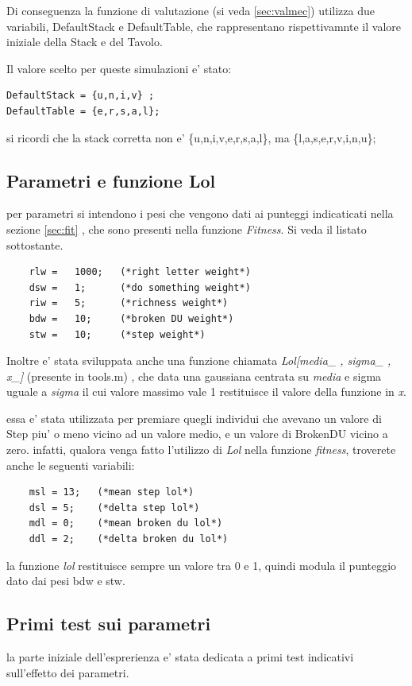 \documentclass[12pt, a4paper]{article}
\begin{document}
Di conseguenza la funzione di valutazione (si veda \ref{sec:valmec}) utilizza due variabili, DefaultStack e DefaultTable, che rappresentano rispettivamnte il valore iniziale della Stack e del Tavolo.

Il valore scelto per queste simulazioni e' stato: 

\begin{lstlisting}
DefaultStack = {u,n,i,v} ;
DefaultTable = {e,r,s,a,l};
\end{lstlisting}

si ricordi che la stack corretta non e' \{u,n,i,v,e,r,s,a,l\}, ma \{l,a,s,e,r,v,i,n,u\};

\subsection{Parametri e funzione Lol}
per parametri si intendono i pesi che vengono dati ai punteggi indicaticati nella sezione \ref{sec:fit} , che sono presenti nella funzione {\itshape Fitness}.
Si veda il listato sottostante.
\begin{lstlisting}
	rlw	=	1000;	(*right letter weight*)
	dsw	=	1;		(*do something weight*)
	riw	=	5;		(*richness weight*) 
	bdw	=	10;		(*broken DU weight*) 
	stw	=	10;		(*step weight*) 
\end{lstlisting}

Inoltre e' stata sviluppata anche una funzione chiamata {\itshape Lol[media\_ , sigma\_ , x\_]} (presente in tools.m) , che data una gaussiana centrata su {\itshape media} e sigma uguale a {\itshape sigma} il cui valore massimo vale 1 restituisce il valore della funzione in {\itshape x}.

essa e' stata utilizzata per premiare quegli individui che avevano un valore di Step piu' o meno vicino ad un valore medio, e un valore di BrokenDU vicino a zero.
infatti, qualora venga fatto l'utilizzo di {\itshape Lol} nella funzione {\itshape fitness}, troverete anche le seguenti variabili:
\begin{lstlisting}
	msl = 13;	(*mean step lol*) 
	dsl = 5;	(*delta step lol*) 
	mdl = 0;	(*mean broken du lol*) 
	ddl = 2;	(*delta broken du lol*) 
\end{lstlisting}

la funzione {\itshape lol} restituisce sempre un valore tra 0 e 1, quindi modula il punteggio dato dai pesi bdw e stw.

\subsection{Primi test sui parametri}
la parte iniziale dell'esprerienza e' stata dedicata a primi test indicativi sull'effetto dei parametri.
\end{document}
